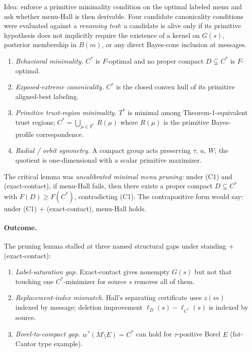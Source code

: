 \documentclass[11pt]{article}
\theoremstyle{definition}
\theoremstyle{remark}
\begin{document}
Idea: enforce a primitive minimality condition on the optimal
labeled menu and ask whether menu-Hall is then derivable. Four
candidate canonicality conditions were evaluated against a
\emph{renaming test}: a candidate is alive only if its primitive
hypothesis does not implicitly require the existence of a kernel on
$G(s)$, posterior membership in $B(m)$, or any direct Bayes-cone
inclusion at messages.
\begin{enumerate}[leftmargin=2em]
\item[(C1)] \emph{Behavioral minimality.} $C^*$ is $F$-optimal and no
proper compact $D \subsetneq C^*$ is $F$-optimal.
\item[(C2)] \emph{Exposed-extreme canonicality.} $C^*$ is the closed
convex hull of its primitive aligned-best labeling.
\item[(C3)] \emph{Primitive trust-region minimality.} $T^*$ is
minimal among Theorem-1-equivalent trust regions; $C^* = \bigcup_{\mu\in T^*}\,R(\mu)$
where $R(\mu)$ is the primitive Bayes-profile correspondence.
\item[(C4)] \emph{Radial / orbit symmetry.} A compact group acts
preserving $\tau$, $u$, $W$; the quotient is one-dimensional with a
scalar primitive maximizer.
\end{enumerate}

The critical lemma was \emph{uncalibrated minimal menu pruning:}
under (C1) and (exact-contact), if menu-Hall fails, then there
exists a proper compact $D \subsetneq C^*$ with $F(D) \ge F(C^*)$,
contradicting (C1). The contrapositive form would say: under (C1) +
(exact-contact), menu-Hall holds.

\paragraph{Outcome.} The pruning lemma stalled at three named
structural gaps under standing + (exact-contact):
\begin{enumerate}[leftmargin=2em]
\item \emph{Label-saturation gap.} Exact-contact gives nonempty
$G(s)$ but not that touching one $C^*$-minimizer for source $s$
removes all of them.
\item \emph{Replacement-index mismatch.} Hall's separating
certificate uses $z(m)$ indexed by message; deletion improvement
$\ell_D(s) - \ell_{C^*}(s)$ is indexed by source.
\item \emph{Borel-to-compact gap.} $\overline{w^*(M\setminus E)} = C^*$
can hold for $\tau$-positive Borel $E$ (fat-Cantor type example).
\end{enumerate}
\end{document}
